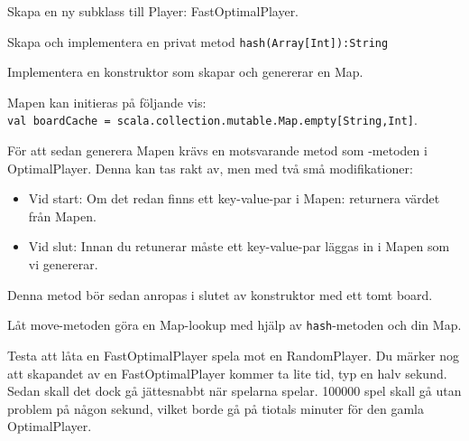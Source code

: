 \Subtask Skapa en ny subklass till Player: FastOptimalPlayer.

\Subtask Skapa och implementera en privat metod \texttt{hash(Array[Int]):String}

\Subtask Implementera en konstruktor som skapar och genererar en Map.

Mapen kan initieras på följande vis: \\\texttt{val boardCache = scala.collection.mutable.Map.empty[String,Int]}.

För att sedan generera Mapen krävs en motsvarande metod som -metoden i OptimalPlayer. Denna kan tas rakt av, men med två små modifikationer:
\begin{itemize}
\item Vid start: Om det redan finns ett key-value-par i Mapen: returnera värdet från Mapen. 
\item Vid slut: Innan du retunerar måste ett key-value-par läggas in i Mapen som vi genererar.
\end{itemize}
Denna metod bör sedan anropas i slutet av konstruktor med ett tomt board.


\Subtask Låt move-metoden göra en Map-lookup med hjälp av \texttt{hash}-metoden och din Map.

\Subtask Testa att låta en FastOptimalPlayer spela mot en RandomPlayer. Du märker nog att skapandet av en FastOptimalPlayer kommer ta lite tid, typ en halv sekund. Sedan skall det dock gå jättesnabbt när spelarna spelar. 100000 spel skall gå utan problem på någon sekund, vilket borde gå på tiotals minuter för den gamla OptimalPlayer.
